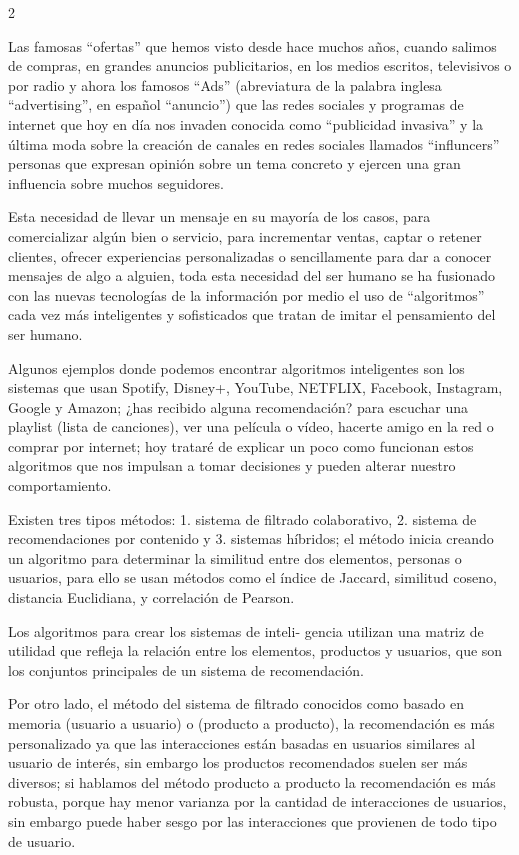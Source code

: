 \documentclass[12pt,spanish,Letterpaper,openany]{book}
\begin{document}
\begin {multicols}{2}

Las famosas ``ofertas'' que hemos visto desde hace muchos años, cuando salimos de compras, en grandes anuncios publicitarios, en los medios escritos, televisivos o por radio y ahora los famosos ``Ads'' (abreviatura de la palabra inglesa ``advertising'', en español ``anuncio'') que las redes sociales y programas de internet que hoy en día nos invaden conocida como ``publicidad invasiva'' y la última moda sobre la creación de canales en redes sociales llamados ``influncers'' personas que expresan opinión sobre un tema concreto y ejercen una gran influencia sobre muchos seguidores.

Esta necesidad de llevar un mensaje en su mayoría de los casos, para comercializar algún bien o servicio, para incrementar ventas, captar o retener clientes, ofrecer experiencias personalizadas o sencillamente para dar a conocer mensajes de algo a alguien, toda esta necesidad del ser humano se ha fusionado con las nuevas tecnologías de la información por medio el uso de ``algoritmos'' cada vez más inteligentes y sofisticados que tratan de imitar el pensamiento del ser humano.

Algunos ejemplos donde podemos encontrar algoritmos inteligentes son los sistemas que usan Spotify, Disney+, YouTube, NETFLIX, Facebook, Instagram, Google y Amazon; ¿has recibido alguna recomendación? para escuchar una playlist (lista de canciones), ver una película o vídeo, hacerte amigo en la red o comprar por internet; hoy trataré de explicar un poco como funcionan estos algoritmos que nos impulsan a tomar decisiones y pueden alterar nuestro comportamiento.

Existen tres tipos métodos: 1. sistema de filtrado colaborativo, 2. sistema de recomendaciones por contenido y 3. sistemas híbridos; el método inicia creando un algoritmo para determinar la similitud entre dos elementos, personas o usuarios, para ello se usan métodos como el índice de Jaccard, similitud coseno, distancia Euclidiana, y correlación de Pearson.

Los algoritmos para crear los sistemas de inteli-
gencia utilizan una matriz de utilidad que refleja la relación entre los elementos, productos y usuarios, que son los conjuntos principales de un sistema de recomendación.

Por otro lado, el método del sistema de filtrado conocidos como basado en memoria (usuario a usuario) o (producto a producto), la recomendación es más personalizado ya que las interacciones están basadas en usuarios similares al usuario de interés, sin embargo los productos recomendados suelen ser más diversos; si hablamos del método producto a producto la recomendación es más robusta, porque hay menor varianza por la cantidad de interacciones de usuarios, sin embargo puede haber sesgo por las interacciones que provienen de todo tipo de usuario.


\end{multicols}
\end{document}

